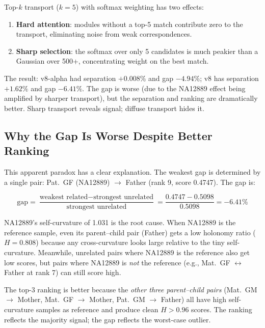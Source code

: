 \documentclass{../yalumba}
\begin{document}
Top-$k$ transport ($k = 5$) with softmax weighting has two effects:
\begin{enumerate}
  \item \textbf{Hard attention}: modules without a top-5 match contribute
    zero to the transport, eliminating noise from weak correspondences.
  \item \textbf{Sharp selection}: the softmax over only 5 candidates is
    much peakier than a Gaussian over 500+, concentrating weight on the
    best match.
\end{enumerate}

The result: v8-alpha had separation $+0.008\%$ and gap $-4.94\%$; v8 has
separation $+1.62\%$ and gap $-6.41\%$.  The gap is worse (due to the
NA12889 effect being amplified by sharper transport), but the separation and
ranking are dramatically better.  Sharp transport reveals signal; diffuse
transport hides it.

\subsection{Why the Gap Is Worse Despite Better Ranking}

This apparent paradox has a clear explanation.  The weakest gap is
determined by a single pair: Pat.~GF (NA12889) $\to$ Father (rank 9,
score 0.4747).  The gap is:

\begin{equation}
  \text{gap} = \frac{\text{weakest related} - \text{strongest unrelated}}
                    {\text{strongest unrelated}}
             = \frac{0.4747 - 0.5098}{0.5098} = -6.41\%
  \label{eq:gap-calc}
\end{equation}


NA12889's self-curvature of 1.031 is the root cause.  When NA12889 is the
reference sample, even its parent--child pair (Father) gets a low holonomy
ratio ($H = 0.808$) because any cross-curvature looks large relative to
the tiny self-curvature.  Meanwhile, unrelated pairs where NA12889 is the
reference also get low scores, but pairs where NA12889 is \emph{not}
the reference (e.g., Mat.~GF $\leftrightarrow$ Father at rank 7) can still
score high.

The top-3 ranking is better because the \emph{other three parent--child
pairs} (Mat.~GM $\to$ Mother, Mat.~GF $\to$ Mother, Pat.~GM $\to$ Father)
all have high self-curvature samples as reference and produce clean $H >
0.96$ scores.  The ranking reflects the majority signal; the gap reflects
the worst-case outlier.
\end{document}
